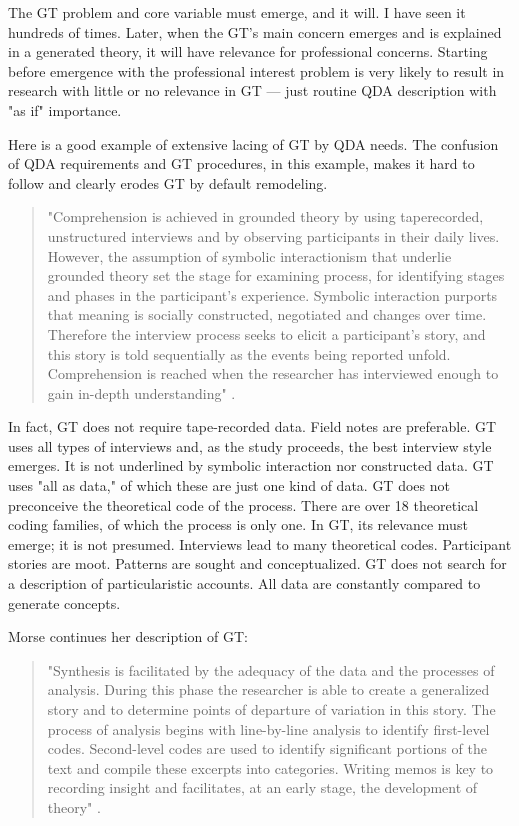 The GT problem and core variable must emerge, and it will.
I have seen it hundreds of times. 
Later, when the GT's main concern emerges and is explained in a generated theory, it will have relevance for professional concerns.
Starting before emergence with the professional interest problem is very likely to result in research with little or no relevance in GT --- just routine QDA description with "as if" importance.

Here is a good example of extensive lacing of GT by QDA needs. 
The confusion of QDA requirements and GT procedures, in this example, 
makes it hard to follow and clearly erodes GT by default remodeling.

\begin{quote}
"Comprehension is achieved in grounded theory by using taperecorded,
unstructured interviews and by observing participants in their
daily lives.
However, the assumption of symbolic interactionism that
underlie grounded theory set the stage for examining process, for
identifying stages and phases in the participant’s experience.
Symbolic interaction purports that meaning is socially constructed, negotiated
and changes over time.
Therefore the interview process seeks to elicit a participant’s story,
and this story is told sequentially as the events being reported unfold.
Comprehension is reached when the researcher has
interviewed enough to gain in-depth understanding"
\citep[p. 39]{incollection.morse86}.
\end{quote}

In fact, GT does not require tape-recorded data. 
Field notes are preferable. 
GT uses all types of interviews and, as the study proceeds, the best interview style emerges. 
It is not underlined by symbolic interaction nor constructed data. 
GT uses "all as data," of which these are just one kind of data. 
GT does not preconceive the theoretical code of the process. 
There are over 18 theoretical coding families, of which the process is only one. 
In GT, its relevance must emerge; it is not presumed. 
Interviews lead to many theoretical codes. 
Participant stories are moot. 
Patterns are sought and conceptualized. 
GT does not search for a description of particularistic accounts. 
All data are constantly compared to generate concepts.

Morse continues her description of GT:

\begin{quote}
"Synthesis is facilitated by the adequacy of the data and the processes of
analysis. 
During this phase the researcher is able to create a generalized story and to determine points of departure of variation in this story. 
The process of analysis begins with line-by-line analysis to identify first-level codes. 
Second-level codes are used to identify significant portions of the text and compile these excerpts into categories. 
Writing memos is key to recording insight and facilitates, at an early stage, the development of theory"
\citep[p. 39]{incollection.morse94}.
\end{quote}

